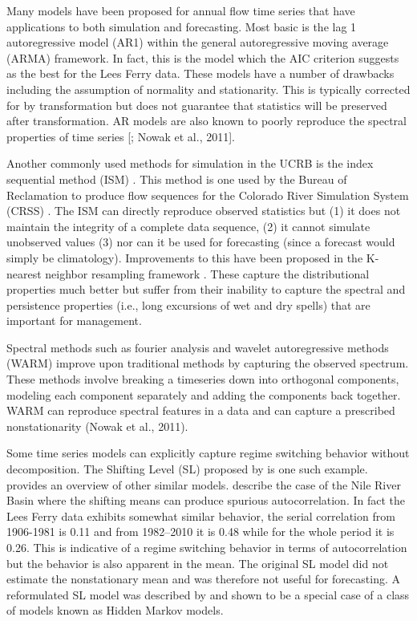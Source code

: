 \documentclass[wrr]{AGUTeX}
\begin{document}
\begin{article}
Many models have been proposed for annual flow time series that have applications to both simulation and forecasting.  Most basic is the lag 1 autoregressive model (AR1) \citep{Salas1980} within the general autoregressive moving average (ARMA) framework.  In fact, this is the model which the AIC criterion suggests as the best for the Lees Ferry data.  These models have a number of drawbacks including the assumption of normality and stationarity.  This is typically corrected for by transformation but does not guarantee that statistics will be preserved after transformation.  AR models are also known to poorly reproduce the spectral properties of time series [\cite{Kwon:2007fj}; Nowak et al., 2011]. 

Another commonly used methods for simulation in the UCRB is the index sequential method (ISM) \citep{Ouarda:1997wz}.  This method is one used by the Bureau of Reclamation to produce flow sequences for the Colorado River Simulation System (CRSS) \citep{BureauofReclamation:1987tk}. The ISM can directly reproduce observed statistics but (1) it does not maintain the integrity of a complete data sequence, (2) it cannot simulate unobserved values (3) nor can it be used for forecasting (since a forecast would simply be climatology).  Improvements to this have been proposed in the K-nearest neighbor resampling framework \citep{Lall:1996ur,Prairie:2008ei}. These capture the distributional properties much better but suffer from their inability to capture the spectral and persistence properties (i.e., long excursions of wet and dry spells) that are important for management. 

Spectral methods such as fourier analysis \cite{Salas1980} and wavelet autoregressive methods (WARM) \cite[and references therein]{Kwon:2007fj} improve upon traditional methods by capturing the observed spectrum.   These methods involve breaking a timeseries down into orthogonal components, modeling each component separately and adding the components back together. WARM can reproduce spectral features in a data and can capture a prescribed nonstationarity (Nowak et al., 2011). 

Some time series models can explicitly capture regime switching behavior without decomposition. The Shifting Level (SL) proposed by \cite{Boes:1978ff} is one such example.  \cite{Fortin:2004gz}   provides an overview of other similar models. \cite{Salas:1980im} describe the case of the Nile River Basin where the shifting means can produce spurious autocorrelation.   In fact the Lees Ferry data exhibits somewhat similar behavior, the serial correlation from 1906-1981 is 0.11 and from 1982--2010 it is 0.48 while for the whole period it is 0.26.  This is indicative of a regime switching behavior in terms of autocorrelation but the behavior is also apparent in the mean.  The original SL model did not estimate the nonstationary mean and was therefore not useful for forecasting.  A reformulated SL model was described by \cite{Fortin:2004gz} and shown to be a special case of a class of models known as Hidden Markov models. 



\end{article}
\end{document}
